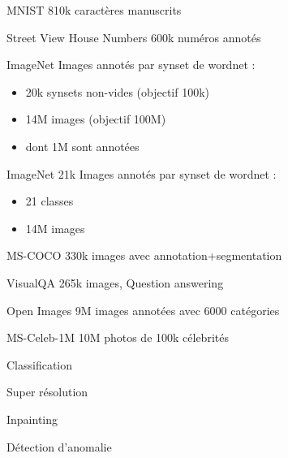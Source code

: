 \begin{frame}{MNIST}
  810k caractères manuscrits
\end{frame}

\begin{frame}{Street View House Numbers}
  600k numéros annotés
\end{frame}

\begin{frame}{ImageNet}
  Images annotés par synset de wordnet :
  \begin{itemize}
    \item 20k synsets non-vides (objectif 100k)
    \item 14M images (objectif 100M)
    \item dont 1M sont annotées
  \end{itemize}
\end{frame}

\begin{frame}{ImageNet 21k}
  Images annotés par synset de wordnet :
  \begin{itemize}
    \item 21 classes
    \item 14M images
  \end{itemize}
\end{frame}

\begin{frame}{MS-COCO}
   330k images avec annotation+segmentation
\end{frame}

\begin{frame}{VisualQA}
  265k images, Question answering
\end{frame}

\begin{frame}{Open Images}
  9M images annotées avec 6000 catégories
\end{frame}

\begin{frame}{MS-Celeb-1M}
  10M photos de 100k célebrités
\end{frame}

\begin{frame}{Classification}
\end{frame}

\begin{frame}{Super résolution}
\end{frame}

\begin{frame}{Inpainting}
\end{frame}

\begin{frame}{Détection d'anomalie}
\end{frame}
